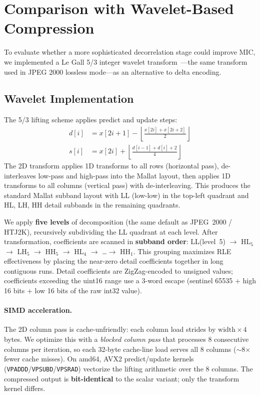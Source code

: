 \documentclass[11pt,twocolumn]{article}
\begin{document}
\section{Comparison with Wavelet-Based Compression}
\label{sec:wavelet}

To evaluate whether a more sophisticated decorrelation stage could improve MIC, we implemented a Le Gall 5/3 integer wavelet transform~\cite{legall1988}---the same transform used in JPEG 2000 lossless mode---as an alternative to delta encoding.

\subsection{Wavelet Implementation}

The 5/3 lifting scheme applies predict and update steps:
\begin{align}
    d[i] &= x[2i{+}1] - \left\lfloor\frac{x[2i] + x[2i{+}2]}{2}\right\rfloor \\
    s[i] &= x[2i] + \left\lfloor\frac{d[i{-}1] + d[i] + 2}{4}\right\rfloor
\end{align}
The 2D transform applies 1D transforms to all rows (horizontal pass), de-interleaves low-pass and high-pass into the Mallat layout, then applies 1D transforms to all columns (vertical pass) with de-interleaving.
This produces the standard Mallat subband layout with LL (low-low) in the top-left quadrant and HL, LH, HH detail subbands in the remaining quadrants.

We apply \textbf{five levels} of decomposition (the same default as JPEG~2000 / HTJ2K), recursively subdividing the LL quadrant at each level.
After transformation, coefficients are scanned in \textbf{subband order}: LL(level~5) $\to$ HL$_5$ $\to$ LH$_5$ $\to$ HH$_5$ $\to$ HL$_4$ $\to$ \ldots $\to$ HH$_1$.
This grouping maximizes RLE effectiveness by placing the near-zero detail coefficients together in long contiguous runs.
Detail coefficients are ZigZag-encoded to unsigned values; coefficients exceeding the uint16 range use a 3-word escape (sentinel 65535 + high 16 bits + low 16 bits of the raw int32 value).

\paragraph{SIMD acceleration.}
The 2D column pass is cache-unfriendly: each column load strides by $\text{width} \times 4$ bytes.
We optimize this with a \emph{blocked column pass} that processes 8 consecutive columns per iteration, so each 32-byte cache-line load serves all 8 columns ($\sim$8$\times$ fewer cache misses).
On amd64, AVX2 predict/update kernels (\texttt{VPADDD}/\texttt{VPSUBD}/\texttt{VPSRAD}) vectorize the lifting arithmetic over the 8 columns.
The compressed output is \textbf{bit-identical} to the scalar variant; only the transform kernel differs.
\end{document}
